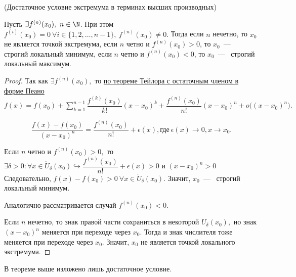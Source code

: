 \begin{theorem}
	\hypertarget{thrm5.23}{(Достаточное условие экстремума в терминах высших производных)} Пусть $\exists f^{(n)}(x_{0}), \ n \in \N$. При этом $f^{(i)} (x_{0}) = 0 \ \forall i \in \{1, 2, \ldots, n-1\}, \
         f^{(n)} (x_{0}) \neq 0.$ Тогда если $n$ нечетно, то $x_{0}$ не является точкой экстремума, если $n$ четно и $f^{(n)}(x_{0}) > 0$, то $x_{0}$~---~ строгий локальный минимум, если $n$ четно и $f^{(n)}(x_{0}) < 0$, то $x_{0}$~---~ строгий локальный максимум.
\end{theorem}
\begin{proof}
	Так как $\exists f^{(n)}(x_{0}),$ то \hyperlink{thrm5.14}{по теореме Тейлора с остаточным членом в форме Пеано} $f(x) = f(x_{0}) + \sum\limits_{k = 1}^{n -1} \dfrac{f^{(k)}(x_{0})}{k!}(x-x_{0})^{k} + \dfrac{f^{(n)}(x_{0})}{n!}(x-x_{0})^{n} + o\Big((x-x_{0})^{n}\Big).$
	
	$$\dfrac{f(x)-f(x_{0})}{(x-x_{0})^{n}} = \dfrac{f^{(n)}(x_{0})}{n!} + \epsilon(x), \textrm{где} \ \epsilon(x) \to 0, x\to x_{0}.$$
	
	Если $n$ четно и $f^{(n)}(x_{0}) > 0,$ то $\exists \delta > 0: \forall  x\in \mathring{U}_{\delta}(x_{0}) \hookrightarrow \dfrac{f^{(n)}(x_{0})}{n!} + \epsilon(x) > 0 $ и $(x-x_{0})^{n} > 0 $ Следовательно, $f(x) - f(x_{0}) > 0\  \forall  x\in \mathring{U}_{\delta}(x_{0})$. Значит, $x_{0}$~---~ строгий локальный минимум.
	
	Аналогично рассматривается случай $f^{(n)}(x_{0}) < 0.$
	
	Если $n$ нечетно, то знак правой части сохраниться в некоторой $U_{\delta}(x_{0}),$ но знак $(x-x_{0})^{n}$ меняется при переходе через $x_{0}.$ Тогда и знак числителя тоже меняется при переходе через $x_{0}.$ Значит, $x_{0}$ не является точкой локального экстремума.
\end{proof}

\begin{note}
	В теореме выше изложено лишь достаточное условие.
\end{note}

